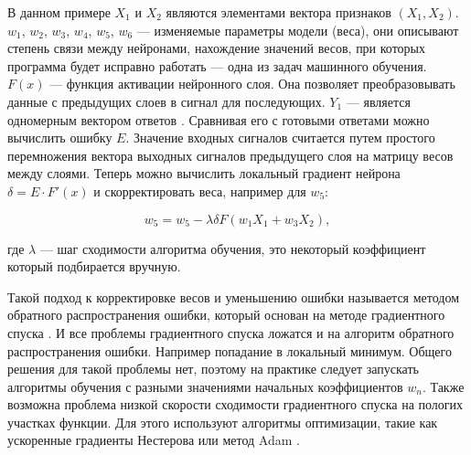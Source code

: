В данном примере $X_{1}$ и $X_{2}$ являются элементами вектора признаков $(X_{1},  X_{2})$. 
$w_{1}$, $w_{2}$, $w_{3}$, $w_{4}$, $w_{5}$, $w_{6}$ — изменяемые параметры модели (веса), они описывают степень связи между нейронами, нахождение значений весов, при которых программа будет исправно работать — одна из задач машинного обучения. $F(x)$ — функция активации нейронного слоя.  Она позволяет преобразовывать данные с предыдущих слоев в сигнал для последующих. $Y_{1}$ — является одномерным вектором ответов \cite{4}. Сравнивая его с готовыми ответами можно вычислить ошибку $E$. Значение входных сигналов считается путем простого перемножения вектора выходных сигналов предыдущего слоя на матрицу весов между слоями. Теперь можно вычислить локальный градиент нейрона $\delta = E \cdot F'(x)$ и скорректировать веса, например для $w_{5}$:

\begin{equation}
w_{5} = w_{5} - \lambda \delta F(w_{1}X_{1} + w_{3}X_{2}),
\end{equation}


где $\lambda$ — шаг сходимости алгоритма обучения, это некоторый коэффициент который подбирается вручную.

Такой подход к корректировке весов и уменьшению ошибки называется методом обратного распространения ошибки, который основан на методе градиентного спуска \cite{1}. И все проблемы градиентного спуска ложатся и на алгоритм обратного распространения ошибки. Например попадание в локальный минимум. Общего решения для такой проблемы нет, поэтому на практике следует запускать алгоритмы обучения с разными значениями начальных коэффициентов $w_{n}$. Также возможна проблема низкой скорости сходимости градиентного спуска на пологих участках функции. Для этого используют алгоритмы оптимизации, такие как ускоренные градиенты Нестерова или метод Adam \cite{2}.